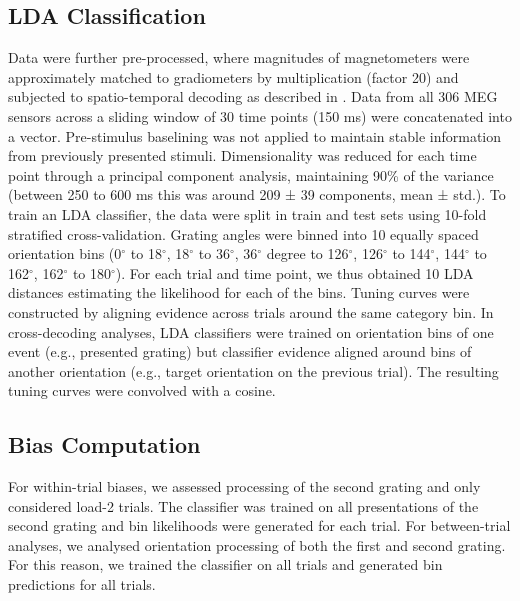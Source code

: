 \documentclass{article}
\begin{document}
\begin{normalsize}
\subsection{LDA Classification}
Data were further pre-processed, where magnitudes of magnetometers were approximately matched to gradiometers by multiplication (factor 20) and subjected to spatio-temporal decoding as described in \parencite{Hajonides2021, Wolff2017, Wolff2020}. Data from all 306 MEG sensors across a sliding window of 30 time points (150 ms) were concatenated into a vector. Pre-stimulus baselining was not applied to maintain stable information from previously presented stimuli. Dimensionality was reduced for each time point through a principal component analysis, maintaining 90\% of the variance (between 250 to 600 ms this was around 209 ± 39 components, mean ± std.). To train an LDA classifier, the data were split in train and test sets using 10-fold stratified cross-validation. Grating angles were binned into 10 equally spaced orientation bins (0$^{\circ}$ to 18$^{\circ}$, 18$^{\circ}$ to 36$^{\circ}$, 36$^{\circ}$ degree to 126$^{\circ}$, 126$^{\circ}$ to  144$^{\circ}$, 144$^{\circ}$ to 162$^{\circ}$, 162$^{\circ}$ to 180$^{\circ}$). For each trial and time point, we thus obtained 10 LDA distances estimating the likelihood for each of the bins. Tuning curves were constructed by aligning evidence across trials around the same category bin. In cross-decoding analyses, LDA classifiers were trained on orientation bins of one event (e.g., presented grating) but classifier evidence aligned around bins of another orientation (e.g., target orientation on the previous trial). The resulting tuning curves were convolved with a cosine.\\

\subsection{Bias Computation}
For within-trial biases, we assessed processing of the second grating and only considered load-2 trials. The classifier was trained on all presentations of the second grating and bin likelihoods were generated for each trial. For between-trial analyses, we analysed orientation processing of both the first and second grating. For this reason, we trained the classifier on all trials and generated bin predictions for all trials. 


\end{normalsize}
\end{document}
